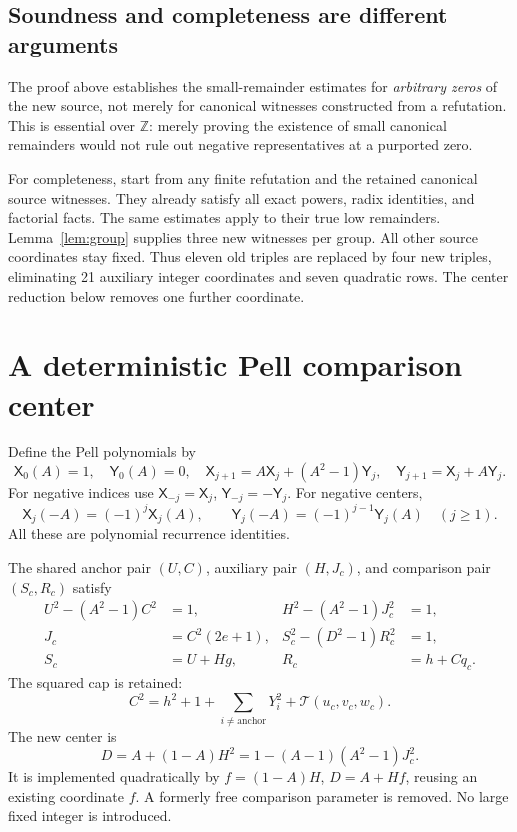 \documentclass[11pt,letterpaper]{article}
\theoremstyle{definition}\newtheorem{definition}[theorem]{Definition}
\theoremstyle{remark}\newtheorem{remark}[theorem]{Remark}
\newcommand{\Z}{\ensuremath{\mathbb Z}}
\newcommand{\X}{\mathsf X}
\newcommand{\Y}{\mathsf Y}
\begin{document}
\subsection{Soundness and completeness are different arguments}
The proof above establishes the small-remainder estimates for \emph{arbitrary zeros} of the new source, not merely for canonical witnesses constructed from a refutation. This is essential over \Z: merely proving the existence of small canonical remainders would not rule out negative representatives at a purported zero.

For completeness, start from any finite refutation and the retained canonical source witnesses. They already satisfy all exact powers, radix identities, and factorial facts. The same estimates apply to their true low remainders. Lemma~\ref{lem:group} supplies three new witnesses per group. All other source coordinates stay fixed. Thus eleven old triples are replaced by four new triples, eliminating 21 auxiliary integer coordinates and seven quadratic rows. The center reduction below removes one further coordinate.

\section{A deterministic Pell comparison center}\label{sec:center}

Define the Pell polynomials by
\[
 \X_0(A)=1,\quad\Y_0(A)=0,\quad
 \X_{j+1}=A\X_j+(A^2-1)\Y_j,\quad
 \Y_{j+1}=\X_j+A\Y_j.
\]
For negative indices use \(\X_{-j}=\X_j\), \(\Y_{-j}=-\Y_j\). For negative centers,
\[
 \X_j(-A)=(-1)^j\X_j(A),\qquad
 \Y_j(-A)=(-1)^{j-1}\Y_j(A)\quad(j\ge1).
\]
All these are polynomial recurrence identities.

The shared anchor pair \((U,C)\), auxiliary pair \((H,J_c)\), and comparison pair \((S_c,R_c)\) satisfy
\begin{align}
 U^2-(A^2-1)C^2&=1,&H^2-(A^2-1)J_c^2&=1,\\
 J_c&=C^2(2e+1),&S_c^2-(D^2-1)R_c^2&=1,\\
 S_c&=U+Hg,&R_c&=h+Cq_c.\label{eq:comparison}
\end{align}
The squared cap is retained:
\begin{equation}\label{eq:anchorcap}
 C^2=h^2+1+\sum_{i\ne\mathrm{anchor}}Y_i^2+\mathcal T(u_c,v_c,w_c).
\end{equation}
The new center is
\begin{equation}\label{eq:center}
 \boxed{D=A+(1-A)H^2
       =1-(A-1)(A^2-1)J_c^2.}
\end{equation}
It is implemented quadratically by \(f=(1-A)H\), \(D=A+Hf\), reusing an existing coordinate \(f\). A formerly free comparison parameter is removed. No large fixed integer is introduced.
\end{document}
